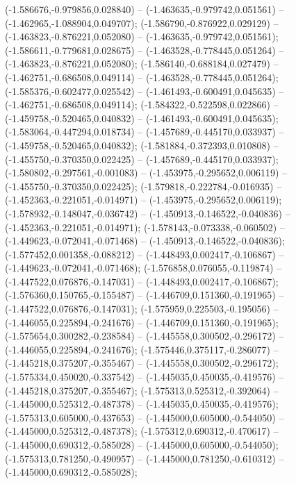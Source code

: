  (-1.586676,-0.979856,0.028840) -- (-1.463635,-0.979742,0.051561) -- (-1.462965,-1.088904,0.049707);
 (-1.586790,-0.876922,0.029129) -- (-1.463823,-0.876221,0.052080) -- (-1.463635,-0.979742,0.051561);
 (-1.586611,-0.779681,0.028675) -- (-1.463528,-0.778445,0.051264) -- (-1.463823,-0.876221,0.052080);
 (-1.586140,-0.688184,0.027479) -- (-1.462751,-0.686508,0.049114) -- (-1.463528,-0.778445,0.051264);
 (-1.585376,-0.602477,0.025542) -- (-1.461493,-0.600491,0.045635) -- (-1.462751,-0.686508,0.049114);
 (-1.584322,-0.522598,0.022866) -- (-1.459758,-0.520465,0.040832) -- (-1.461493,-0.600491,0.045635);
 (-1.583064,-0.447294,0.018734) -- (-1.457689,-0.445170,0.033937) -- (-1.459758,-0.520465,0.040832);
 (-1.581884,-0.372393,0.010808) -- (-1.455750,-0.370350,0.022425) -- (-1.457689,-0.445170,0.033937);
 (-1.580802,-0.297561,-0.001083) -- (-1.453975,-0.295652,0.006119) -- (-1.455750,-0.370350,0.022425);
 (-1.579818,-0.222784,-0.016935) -- (-1.452363,-0.221051,-0.014971) -- (-1.453975,-0.295652,0.006119);
 (-1.578932,-0.148047,-0.036742) -- (-1.450913,-0.146522,-0.040836) -- (-1.452363,-0.221051,-0.014971);
 (-1.578143,-0.073338,-0.060502) -- (-1.449623,-0.072041,-0.071468) -- (-1.450913,-0.146522,-0.040836);
 (-1.577452,0.001358,-0.088212) -- (-1.448493,0.002417,-0.106867) -- (-1.449623,-0.072041,-0.071468);
 (-1.576858,0.076055,-0.119874) -- (-1.447522,0.076876,-0.147031) -- (-1.448493,0.002417,-0.106867);
 (-1.576360,0.150765,-0.155487) -- (-1.446709,0.151360,-0.191965) -- (-1.447522,0.076876,-0.147031);
 (-1.575959,0.225503,-0.195056) -- (-1.446055,0.225894,-0.241676) -- (-1.446709,0.151360,-0.191965);
 (-1.575654,0.300282,-0.238584) -- (-1.445558,0.300502,-0.296172) -- (-1.446055,0.225894,-0.241676);
 (-1.575446,0.375117,-0.286077) -- (-1.445218,0.375207,-0.355467) -- (-1.445558,0.300502,-0.296172);
 (-1.575334,0.450020,-0.337542) -- (-1.445035,0.450035,-0.419576) -- (-1.445218,0.375207,-0.355467);
 (-1.575313,0.525312,-0.392064) -- (-1.445000,0.525312,-0.487378) -- (-1.445035,0.450035,-0.419576);
 (-1.575313,0.605000,-0.437653) -- (-1.445000,0.605000,-0.544050) -- (-1.445000,0.525312,-0.487378);
 (-1.575312,0.690312,-0.470617) -- (-1.445000,0.690312,-0.585028) -- (-1.445000,0.605000,-0.544050);
 (-1.575313,0.781250,-0.490957) -- (-1.445000,0.781250,-0.610312) -- (-1.445000,0.690312,-0.585028);
